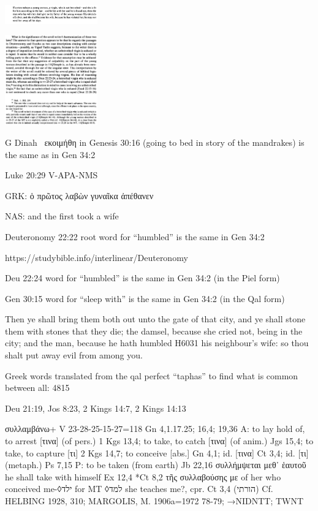 \documentclass[11pt]{article}
\begin{document}
\includegraphics[width=4cm]{dead_sea_scrolls}

\includegraphics[width=4cm]{dss_comment}

G Dinah 
  εκοιμήθη in Genesis 30:16 (going to bed in story of the mandrakes) is the same as in Gen 34:2 


Luke 20:29 V-APA-NMS
\begin{greek}
GRK: ὁ πρῶτος λαβὼν γυναῖκα ἀπέθανεν
\end{greek}
NAS: and the first took a wife


Deuteronomy 22:22 root word for “humbled” is the same in Gen 34:2

 https://studybible.info/interlinear/Deuteronomy%



 Deu 22:24 word for “humbled” is the same in Gen 34:2 (in the Piel form)


Gen 30:15 word for “sleep with” is the same in Gen 34:2 (in the Qal form)

Then ye shall bring them both out unto the gate of that city, and ye shall stone them with stones that they die; the damsel, because she cried not, being in the city; and the man, because he hath humbled H6031 his neighbour's wife: so thou shalt put away evil from among you.


Greek words translated from the qal perfect “taphas” to find what is common between all:
4815

Deu 21:19, Jos 8:23, 2 Kings 14:7, 2 Kings 14:13
\begin{greek}
συλλαμβάνω+ V 23-28-25-15-27=118
Gn 4,1.17.25; 16,4; 19,36
A: to lay hold of, to arrest [τινα] (of pers.) 1 Kgs 13,4; to take, to catch [τινα] (of anim.) Jgs 15,4; to
take, to capture [τι] 2 Kgs 14,7; to conceive [abs.] Gn 4,1; id. [τινα] Ct 3,4; id. [τι] (metaph.) Ps 7,15
P: to be taken (from earth) Jb 22,16
συλλήμψεται μεθ᾽ ἑαυτοῦ he shall take with himself Ex 12,4
*Ct 8,2 τῆς συλλαβούσης με of her who conceived me-◊ילד for MT ◊למד she teaches me?, cpr. Ct 3,4
 (הורתי)
Cf. HELBING 1928, 310; MARGOLIS, M. 1906a=1972 78-79; →NIDNTT; TWNT
\end{greek}
\end{document}
